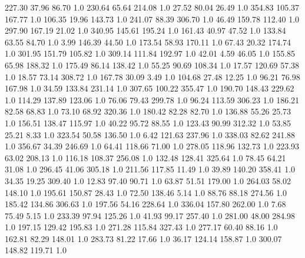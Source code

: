     227.30     37.96     86.70  1.0
    230.64     65.64    214.08  1.0
     27.52     80.04     26.49  1.0
    354.83    105.37    167.77  1.0
    106.35     19.96    143.73  1.0
    241.07     88.39    306.70  1.0
     46.49    159.78    112.40  1.0
    297.90    167.19     21.02  1.0
    340.95    145.61    195.24  1.0
    161.43     40.97     47.52  1.0
    133.84     63.55     84.70  1.0
      3.99    146.39     44.50  1.0
    173.54     58.93    170.11  1.0
     67.43     20.32    174.74  1.0
    301.95    151.79    105.82  1.0
    309.14    111.84    192.97  1.0
     42.01      4.59     46.05  1.0
    155.85     65.98    188.32  1.0
    175.49     86.14    138.42  1.0
     55.25     90.69    108.34  1.0
     17.57    120.69     57.38  1.0
     18.57     73.14    308.72  1.0
    167.78     30.09      3.49  1.0
    104.68     27.48     12.25  1.0
     96.21     76.98    167.98  1.0
     34.59    133.84    231.14  1.0
    307.65    100.22    355.47  1.0
    190.70    148.43    229.62  1.0
    114.29    137.89    123.06  1.0
     76.06     79.43    299.78  1.0
     96.24    113.59    306.23  1.0
    186.21     82.58     68.83  1.0
     73.10     68.92    320.36  1.0
    180.42     82.28     82.70  1.0
    136.88     55.26     25.73  1.0
    156.51    138.47    115.97  1.0
     40.22     95.72     88.55  1.0
    123.43     90.99    312.32  1.0
     53.85     25.21      8.33  1.0
    323.54     50.58    136.50  1.0
      6.42    121.63    237.96  1.0
    338.03     82.62    241.88  1.0
    356.67     34.39    246.69  1.0
     64.41    118.66     71.00  1.0
    278.05    118.96    132.73  1.0
    223.93     63.02    208.13  1.0
    116.18    108.37    256.08  1.0
    132.48    128.41    325.64  1.0
     78.45     64.21     31.08  1.0
    296.45     41.06    305.18  1.0
    211.56    117.85     11.49  1.0
     39.89    140.20    358.41  1.0
     34.35     19.25    309.40  1.0
     12.83     97.40     90.71  1.0
     63.87     51.51    179.00  1.0
    264.03     58.02    148.10  1.0
    195.61    150.87     28.43  1.0
     72.50    138.46      5.14  1.0
     88.76     88.18    274.56  1.0
    185.42    134.86    306.63  1.0
    197.56     54.16    228.64  1.0
    336.04    157.80    262.00  1.0
      7.68     75.49      5.15  1.0
    233.39     97.94    125.26  1.0
     41.93     99.17    257.40  1.0
    281.00     48.00    284.98  1.0
    197.15    129.42    195.83  1.0
    271.28    115.84    327.43  1.0
    277.17     60.40     88.16  1.0
    162.81     82.29    148.01  1.0
    283.73     81.22     17.66  1.0
     36.17    124.14    158.87  1.0
    300.07    148.82    119.71  1.0
